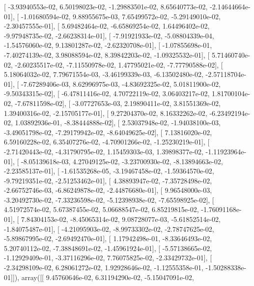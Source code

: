 \documentclass{article}
\begin{document}
       [ -3.93940553e-02,   6.50198023e-02,  -1.29883501e-02,
          8.65640773e-02,  -2.14644664e-01],
       [ -1.01680594e-02,   9.88955675e-03,   7.65499572e-02,
         -5.29149010e-02,  -2.30457555e-01],
       [  5.69482464e-02,  -6.65869254e-02,   1.64496402e-02,
         -9.97948735e-02,  -2.66238314e-01],
       [ -7.91921933e-02,  -5.08804339e-04,  -1.54576060e-02,
          9.13801287e-02,  -2.62320708e-01],
       [ -1.07855698e-01,  -7.40274139e-02,   3.98088594e-02,
          8.39842203e-02,  -1.09325532e-01],
       [  5.71460740e-02,  -2.60235517e-02,  -7.11550978e-02,
          1.47795021e-02,  -7.77790588e-02],
       [  5.18064032e-02,   7.79671554e-03,  -3.46199339e-03,
         -6.13502480e-02,  -2.57118704e-01],
       [ -7.67289406e-03,   8.62996975e-03,  -4.83692325e-02,
          5.01811900e-02,  -9.50343315e-02],
       [ -6.47811416e-02,   4.70722119e-02,   3.06403217e-02,
          1.81700104e-02,  -7.67811598e-02],
       [ -3.07727653e-03,   2.19890411e-02,   3.81551369e-02,
          1.39400316e-02,  -2.15705177e-01],
       [  9.27204370e-02,   8.16332262e-02,  -6.23492194e-02,
          1.03892936e-01,  -8.38444888e-02],
       [  2.53037948e-02,  -1.94038100e-03,  -3.49051798e-02,
         -7.29179942e-02,  -8.64049625e-02],
       [  7.13816020e-02,   6.59160228e-02,   6.35407276e-02,
         -4.70901266e-02,  -1.25230219e-01],
       [ -2.71420443e-02,  -4.31790795e-02,   1.15459303e-03,
          1.39898377e-02,  -1.11923964e-01],
       [ -8.05139618e-03,   4.27049125e-02,  -3.23700930e-02,
         -8.13894663e-02,  -2.23585137e-01],
       [ -1.61535268e-05,  -3.19467458e-02,  -1.59364570e-02,
         -9.79219351e-02,  -2.51253462e-01],
       [  4.38893947e-02,  -7.35728498e-02,  -2.66752746e-03,
         -6.86249878e-02,  -2.44876680e-01],
       [  9.96548000e-03,  -3.20492730e-02,  -7.33236598e-02,
         -5.12398938e-02,  -7.65598925e-02],
       [  4.51972574e-02,   5.67387455e-02,   5.06688547e-02,
          6.85219815e-02,  -1.76091168e-01],
       [  7.84304153e-02,  -8.45065314e-02,   9.08728077e-03,
         -5.61852514e-02,  -1.84075487e-01],
       [ -4.21095903e-02,  -8.99733302e-02,  -2.78747625e-02,
         -5.89867995e-02,  -2.69492470e-01],
       [  1.17942498e-01,  -8.33646493e-02,   5.20740112e-02,
         -7.38848691e-02,  -1.45961924e-01],
       [ -5.57138665e-02,  -1.12929409e-01,  -3.37116296e-02,
          7.76075825e-02,  -2.33429732e-01],
       [ -2.34298109e-02,   6.28061272e-02,   1.92928646e-02,
         -1.12555358e-01,  -1.50288338e-01]]), array([[  9.45760646e-02,   6.31194290e-02,  -5.15047091e-02,
\end{document}
